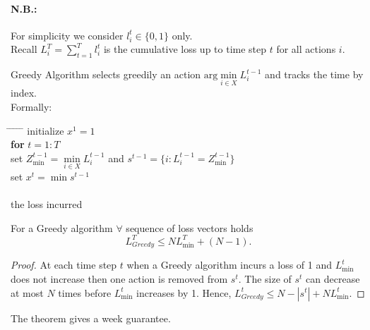 \paragraph{N.B.:}For simplicity we consider $l^t_i\in\{0,1\}$ only.\\
Recall $L^T_i=\sum\limits_{t=1}^T l^t_i$ is the cumulative loss up to time step $t$ for all actions $i$.
\begin{definition}
Greedy Algorithm selects greedily an action $\text{arg}\min\limits_{i\in X}L^{t-1}_i$ and tracks the time by index.\\
Formally:
\begin{tabbing}
\hspace*{.25in} \= \hspace*{.25in} \= \hspace*{.25in} \= \hspace*{.25in} \= \hspace*{.25in} \=\kill
\> initialize $x^1=1$\\
\> {\bf for} $t=1:T$\\
\>\> set $Z^{t-1}_{\min}=\min\limits_{i\in X}L^{t-1}_i$ and $s^{t-1}=\{i:L^{t-1}_i=Z^{t-1}_{\min}\}$\\
\>\> set $x^t=\min s^{t-1}$\\
 \\
 the loss incurred
\end{tabbing}
\end{definition}
\begin{theorem}
For a Greedy algorithm $\forall$ sequence of loss vectors holds
$$
L^T_{Greedy}\leqslant NL^T_{\min}+(N-1).
$$
\end{theorem} 
\begin{proof}
At each time step $t$  when a Greedy algorithm incurs a loss of 1 and $L^t_{\min}$ does not increase then one action is removed from $s^t$. The size of $s^t$ can decrease at most $N$ times before $L^t_{\min}$ increases by 1. Hence, $L^t_{Greedy}\leqslant N-|s^t|+NL^t_{\min}$.
\end{proof}
The theorem gives a week guarantee.

